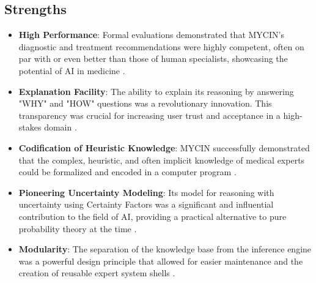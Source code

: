 \documentclass[conference]{IEEEtran}
\begin{document}
\subsection{Strengths}
\begin{itemize}
    \item \textbf{High Performance}: Formal evaluations demonstrated that MYCIN's diagnostic and treatment recommendations were highly competent, often on par with or even better than those of human specialists, showcasing the potential of AI in medicine \cite{b16}.
    \item \textbf{Explanation Facility}: The ability to explain its reasoning by answering "WHY" and "HOW" questions was a revolutionary innovation. This transparency was crucial for increasing user trust and acceptance in a high-stakes domain \cite{b27}.
    \item \textbf{Codification of Heuristic Knowledge}: MYCIN successfully demonstrated that the complex, heuristic, and often implicit knowledge of medical experts could be formalized and encoded in a computer program \cite{b8}.
    \item \textbf{Pioneering Uncertainty Modeling}: Its model for reasoning with uncertainty using Certainty Factors was a significant and influential contribution to the field of AI, providing a practical alternative to pure probability theory at the time \cite{b20}.
    \item \textbf{Modularity}: The separation of the knowledge base from the inference engine was a powerful design principle that allowed for easier maintenance and the creation of reusable expert system shells \cite{b18}.
\end{itemize}
\end{document}
